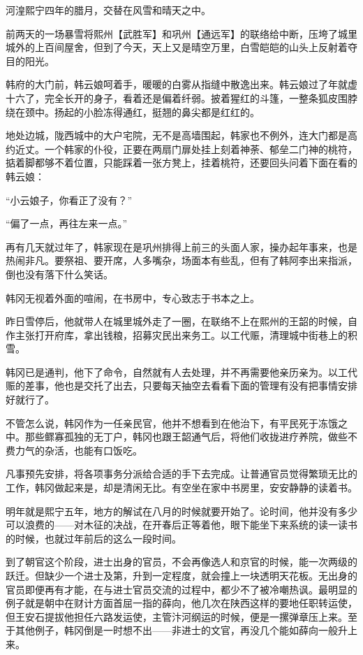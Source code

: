 河湟熙宁四年的腊月，交替在风雪和晴天之中。

前两天的一场暴雪将熙州【武胜军】和巩州【通远军】的联络给中断，压垮了城里城外的上百间屋舍，但到了今天，天上又是晴空万里，白雪皑皑的山头上反射着夺目的阳光。

韩府的大门前，韩云娘呵着手，暖暖的白雾从指缝中散逸出来。韩云娘过了年就虚十六了，完全长开的身子，看着还是偏着纤弱。披着猩红的斗篷，一整条狐皮围脖绕在颈中。扬起的小脸冻得通红，挺翘的鼻尖都是红红的。

地处边城，陇西城中的大户宅院，无不是高墙围起，韩家也不例外，连大门都是高约近丈。一个韩家的仆役，正要在两扇门扉处挂上刻着神荼、郁垒二门神的桃符，掂着脚都够不着位置，只能踩着一张方凳上，挂着桃符，还要回头问着下面在看的韩云娘：

“小云娘子，你看正了没有？”

“偏了一点，再往左来一点。”

再有几天就过年了，韩家现在是巩州排得上前三的头面人家，操办起年事来，也是热闹非凡。要祭祖、要开席，人多嘴杂，场面本有些乱，但有了韩阿李出来指派，倒也没有落下什么笑话。

韩冈无视着外面的喧闹，在书房中，专心致志于书本之上。

昨日雪停后，他就带人在城里城外走了一圈，在联络不上在熙州的王韶的时候，自作主张打开府库，拿出钱粮，招募灾民出来务工。以工代赈，清理城中街巷上的积雪。

韩冈已是通判，他下了命令，自然就有人去处理，并不再需要他亲历亲为。以工代赈的差事，他也是交托了出去，只要每天抽空去看看下面的管理有没有把事情安排好就行了。

不管怎么说，韩冈作为一任亲民官，他并不想看到在他治下，有平民死于冻饿之中。那些鳏寡孤独的无丁户，韩冈也跟王韶通气后，将他们收拢进疗养院，做些不费力气的杂活，也能有口饭吃。

凡事预先安排，将各项事务分派给合适的手下去完成。让普通官员觉得繁琐无比的工作，韩冈做起来是，却是清闲无比。有空坐在家中书房里，安安静静的读着书。

明年就是熙宁五年，地方的解试在八月的时候就要开始了。论时间，他并没有多少可以浪费的——对木征的决战，在开春后正等着他，眼下能坐下来系统的读一读书的时候，也就过年前后的这么一段时间。

到了朝官这个阶段，进士出身的官员，不会再像选人和京官的时候，能一次两级的跃迁。但缺少一个进士及第，升到一定程度，就会撞上一块透明天花板。无出身的官员即便再有才能，在与进士官员交流的过程中，都少不了被冷嘲热讽。最明显的例子就是朝中在财计方面首屈一指的薛向，他几次在陕西这样的要地任职转运使，但王安石提拔他担任六路发运使，主管汴河纲运的时候，便是一摞弹章压上来。至于其他例子，韩冈倒是一时想不出——非进士的文官，再没几个能如薛向一般升上来。

